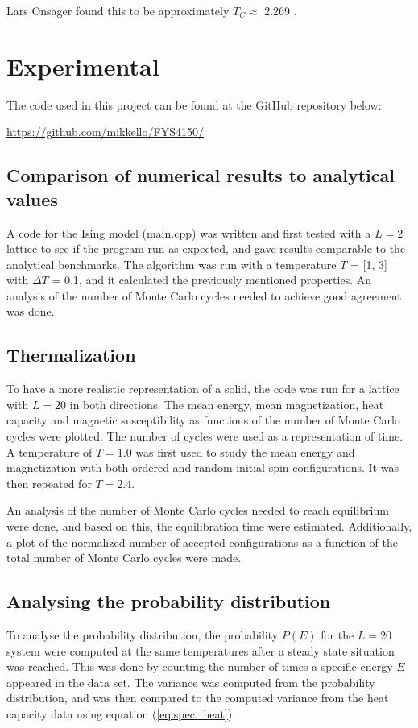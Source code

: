 \documentclass[10pt,a4paper,titlepage]{article}
\begin{document}
Lars Onsager found this to be approximately $T_C \approx$ 2.269 \cite{onsanger}. 


\section{Experimental}
The code used in this project can be found at the GitHub repository below:

\par \url{https://github.com/mikkello/FYS4150/}

\subsection{Comparison of numerical results to analytical values}
A code for the Ising model (main.cpp) was written and first tested with a $L = 2$ lattice to see if the program run as expected, and gave results comparable to the analytical benchmarks. The algorithm was run with a temperature $T$ = [1, 3] with $\Delta T$ = 0.1, and it calculated the previously  mentioned properties. An analysis of the number of Monte Carlo cycles needed to achieve good agreement was done. 

\subsection{Thermalization}
To have a more realistic representation of a solid, the code was run for a lattice with $L=20$ in both directions. The mean energy, mean magnetization, heat capacity and magnetic susceptibility as functions of the number of Monte Carlo cycles were plotted. The number of cycles were used as a representation of time. A temperature of $T = 1.0$ was first used to study the mean energy and magnetization with both ordered and random initial spin configurations. It was then repeated for $T = 2.4$. 

An analysis of the number of Monte Carlo cycles needed to reach equilibrium were done, and based on this, the equilibration time were estimated. Additionally, a plot of the normalized number of accepted configurations as a function of the total number of Monte Carlo cycles were made. 

\subsection{Analysing the probability distribution}
To analyse the probability distribution, the probability $P(E)$ for the $L=20$ system were computed at the same temperatures after a steady state situation was reached. This was done by counting the number of times a specific energy $E$ appeared in the data set.  The variance was computed from the probability distribution, and was then compared to the computed variance from the heat capacity data using equation (\ref{eq:spec_heat}). 
\end{document}
